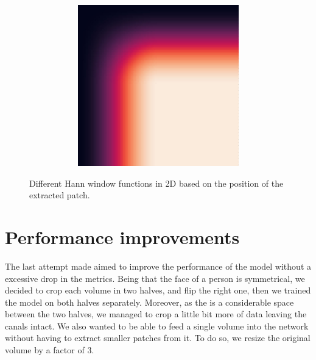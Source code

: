 \begin{figure}
\begin{subfigure}{0.5\textwidth}
\begin{subfigure}{.32\textwidth}
    \end{subfigure}
    \begin{subfigure}{.32\textwidth}
      \centering
      \includegraphics[width=\textwidth]{Images/hann_window_22.jpg}
    \end{subfigure}
  \end{subfigure}
  \caption{Different Hann window functions in 2D based on the position of the extracted patch.}
  \label{fig:hann-window}
\end{figure}


\section{Performance improvements}
The last attempt made aimed to improve the performance of the model without a
excessive drop in the metrics. Being that the face of a person is symmetrical,
we decided to crop each volume in two halves, and flip the right one, then we
trained the model on both halves separately. Moreover, as the is a considerable
space between the two halves, we managed to crop a little bit more of data
leaving the canals intact. We also wanted to be able to feed a single volume
into the network without having to extract smaller patches from it. To do so, we
resize the original volume by a factor of $3$.

